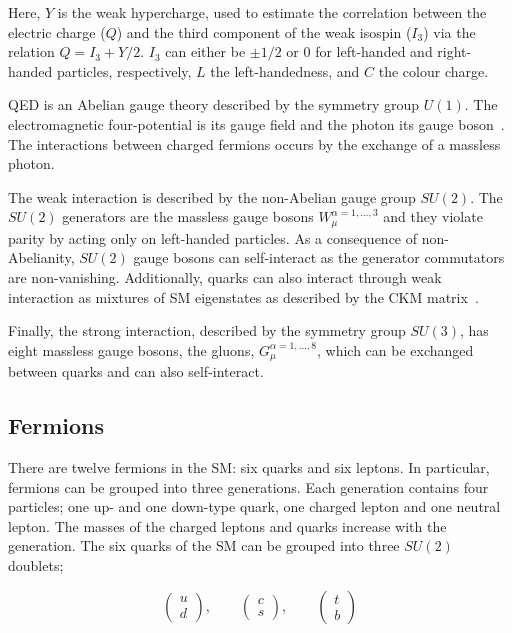 			\noindent Here, $Y$ is the weak hypercharge, used to estimate the correlation between the electric charge ($Q$) and the third component of the weak isospin ($I_3$) via the relation $Q = I_3 + Y/2$. $I_3$ can either be $\pm 1/2$ or $0$ for left-handed and right-handed particles, respectively, $L$ the left-handedness, and $C$ the colour charge. 

			\ac{QED} is an Abelian gauge theory described by the symmetry group $U(1)$. The electromagnetic four-potential is its gauge field and the photon its gauge boson~\cite{Pich2012}. The interactions between charged fermions occurs by the exchange of a massless photon. 

			The weak interaction is described by the non-Abelian gauge group $SU(2)$. The $SU(2)$ generators are the massless gauge bosons $W_{\mu}^{\alpha = 1,\dots,3}$ and they violate parity by acting only on left-handed particles. As a consequence of non-Abelianity, $SU(2)$ gauge bosons can self-interact as the generator commutators are non-vanishing. Additionally, quarks can also interact through weak interaction as mixtures of \ac{SM} eigenstates as described by the CKM matrix~\cite{PDG}.

			Finally, the strong interaction, described by the symmetry group $SU(3)$, has eight massless gauge bosons, the gluons, $G_{\mu}^{\alpha=1,\dots,8}$, which can be exchanged between quarks and can also self-interact. 



		\subsection*{Fermions}

			There are twelve fermions in the \ac{SM}: six quarks and six leptons. In particular, fermions can be grouped into three generations. Each generation contains four particles; one up- and one down-type quark, one charged lepton and one neutral lepton. The masses of the charged leptons and quarks increase with the generation. The six quarks of the \ac{SM} can be grouped into three $SU(2)$ doublets;

			\begin{equation*}
			\label{eq:quark_doublets}
				\begin{pmatrix} u \\ d \end{pmatrix}, \qquad 
				\begin{pmatrix} c \\ s \end{pmatrix}, \qquad 
				\begin{pmatrix} t \\ b \end{pmatrix}
			\end{equation*}

